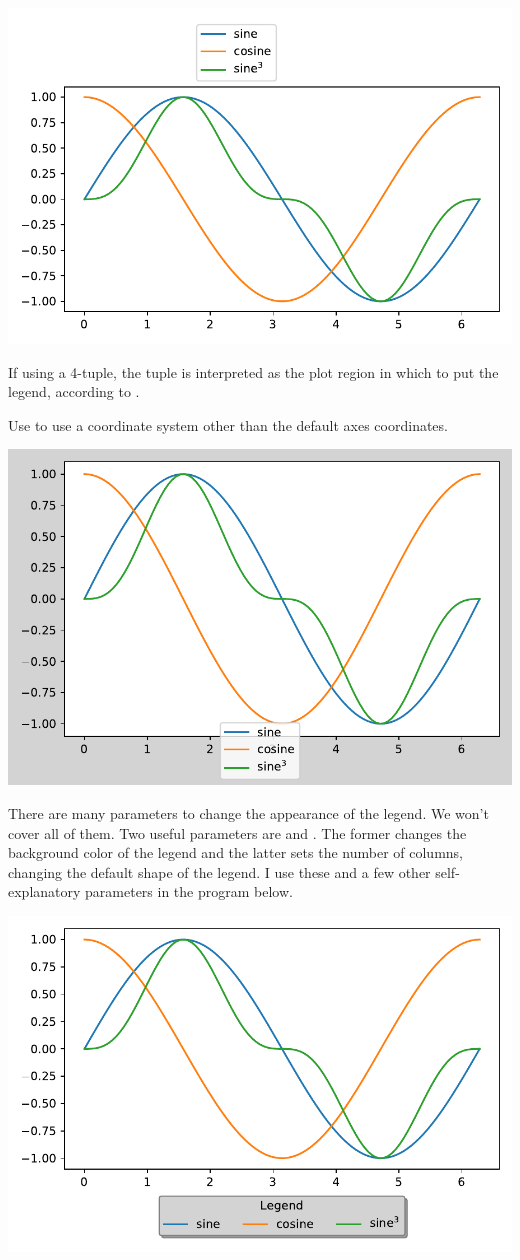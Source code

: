 
\begin{center}
    \includegraphics[width = .7\textwidth]{figures/proseplots/legend-bb-loc.pdf}
\end{center}
If using a 4-tuple, the tuple is interpreted as the plot region in which to put the legend, according to . 

Use  to use a coordinate system other than the default axes coordinates. 


\begin{center}
    \includegraphics[width = .7\textwidth]{figures/proseplots/legend-transform.pdf}
\end{center}

There are many parameters to change the appearance of the legend. We won't cover all of them. Two useful parameters are  and . The former changes the background color of the legend and the latter sets the number of columns, changing the default shape of the legend. I use these and a few other self-explanatory parameters in the program below. 


\begin{center}
    \includegraphics[width = .7\textwidth]{figures/proseplots/legend-shape.pdf}
\end{center}


